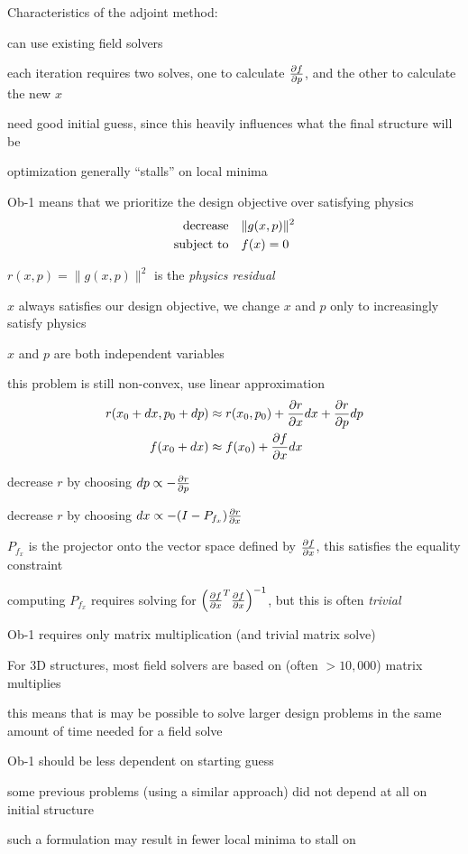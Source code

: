 \documentclass[dvips,landscape]{foils}
\renewcommand{\oursection}[1]{
\foilhead[-1.0cm]{#1}
}
\begin{document}
Characteristics of the adjoint method:
\BIT
\item can use existing field solvers 
\item each iteration requires two solves, one to calculate $\frac{\partial f}{\partial p}$, and the other to calculate the new $x$
\item need good initial guess, since this heavily influences what the final structure will be
\item optimization generally ``stalls'' on local minima
\EIT

\oursection{Objective-first approach}
Ob-1 means that we prioritize the design objective over satisfying physics
\begin{align}
\mbox{decrease} & \quad \|g(x,p)\|^2 \\
\mbox{subject to} & \quad f(x) = 0
\end{align}
\BIT
\item $r(x,p) = \|g(x,p)\|^2$ is the \emph{physics residual}
\item $x$ always satisfies our design objective, we change $x$ and $p$ only to increasingly satisfy physics
\item $x$ and $p$ are both independent variables
\EIT
\newpage

\BIT
\item this problem is still non-convex, use linear approximation 
\begin{align}
r(x_0+dx,p_0+dp) & \approx r(x_0,p_0) + \frac{\partial r}{\partial x} dx + \frac{\partial r}{\partial p} dp \\
f(x_0+dx) & \approx f(x_0) + \frac{\partial f}{\partial x} dx 
\end{align}
\item decrease $r$ by choosing $dp \propto -\frac{\partial r}{\partial p}$
\item decrease $r$ by choosing 
    $dx \propto - (I - P_{f_x}) \frac{\partial r}{\partial x}$
\item $P_{f_x}$ is the projector onto the vector space defined by $\frac{\partial f}{\partial x}$, this satisfies the equality constraint
\item computing $P_{f_x}$ requires solving for $\left(\frac{\partial f}{\partial x}^T \frac{\partial f}{\partial x}\right)^{-1}$, but this is often \emph{trivial}
\EIT
\newpage


Ob-1 requires only matrix multiplication (and trivial matrix solve)
\BIT
\item For 3D structures, most field solvers are based on (often $>10,000$) matrix multiplies
\item this means that is may be possible to solve larger design problems in the same amount of time needed for a field solve
\EIT

\vspace{3ex}

Ob-1 should be less dependent on starting guess 
\BIT
\item some previous problems (using a similar approach) did not depend at all on initial structure
\item such a formulation may result in fewer local minima to stall on
\EIT
\vfill
\end{document}
